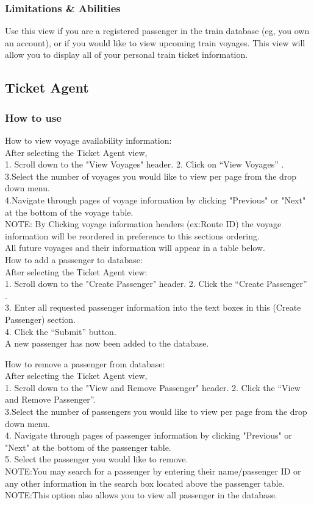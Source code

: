 \documentclass[letter]{article}
\begin{document}
\subsubsection{Limitations \& Abilities}
Use this view if you are a registered passenger in the train database (eg, you own an account), or if you would like to view upcoming train voyages. This view will allow you to display all of your personal train ticket information.

\subsection{Ticket Agent}
\subsubsection{How to use}

How to view voyage availability information:\\
After selecting the Ticket Agent view,\\  
1. Scroll down to the "View Voyages" header.
2. Click on “View Voyages” . \\
3.Select the number of voyages you would like to view per page from the drop down menu.\\
4.Navigate through pages of voyage information by clicking "Previous" or "Next" at the bottom of the voyage table.\\
NOTE: By Clicking  voyage information headers (ex:Route ID) the voyage information will be reordered in preference to this sections ordering.\\ 
All future voyages and their information will appear in a table below.\\ 


How to add a passenger to database:\\
After selecting the Ticket Agent view:\\
1. Scroll down to the "Create Passenger" header.
2. Click the “Create Passenger” .\\
3. Enter all requested passenger information into the text boxes in this (Create Passenger) section.\\
4. Click the “Submit” button.\\
A new passenger has now been added to the database. 


How to remove a passenger from database:\\
After selecting the Ticket Agent view,\\
1. Scroll down to the "View and Remove Passenger" header.
2. Click the “View and Remove Passenger”.\\
3.Select the number of passengers you would like to view per page from the drop down menu.\\
4. Navigate through pages of passenger information by clicking "Previous" or "Next" at the bottom of the passenger table.\\
5. Select the passenger you would like to remove. \\
NOTE:You may search for a passenger by entering their name/passenger ID or any other information in the search box located above the passenger table.
NOTE:This option also allows you to view all passenger in the database.\\
\end{document}
